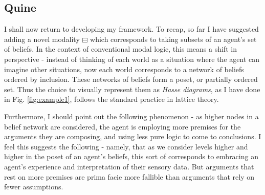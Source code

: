 \documentclass[11pt]{article}
\numberwithin{equation}{subsection}
\newcommand{\BM}{\boxminus}
\begin{document}
\subsection{Quine}\label{quine}
I shall now return to developing my framework.  To recap, so far I
have suggested adding a novel modality $\BM$ which corresponds to
taking subsets of an agent's set of beliefs.  In the context of
conventional modal logic, this means a shift in perspective - instead
of thinking of each world as a situation where the agent can imagine
other situations, now each world corresponds to a network of beliefs
ordered by inclusion. These networks of beliefs form a poset, or
partially ordered set.  Thus the choice to visually represent them as
\emph{Hasse diagrams}, as I have done in Fig. \ref{fig:example1}, 
follows the standard practice in lattice theory. 

Furthermore, I should point out the following phenomenon - as higher
nodes in a belief network are considered, the agent is employing more
premises for the arguments they are composing, and using less pure
logic to come to conclusions.  I feel this suggests the following -
namely, that as we consider levels higher and higher in the poset of
an agent's beliefs, this sort of corresponds to embracing an agent's
experience and interpretation of their sensory data.  But arguments
that rest on more premises are prima facie more fallible than
arguments that rely on fewer assumptions.
\end{document}
